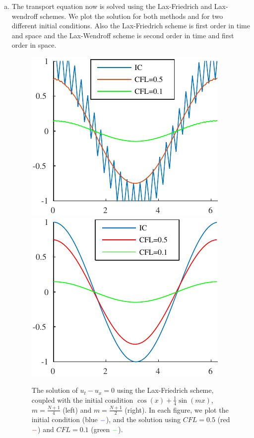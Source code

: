 \documentclass[10pt,a4paper,twoside, french]{article}
\numberwithin{equation}{section}
\numberwithin{figure}{section}
\numberwithin{table}{section}
\begin{document}
\begin{enumerate}
\begin{enumerate}[a.]
\item The transport equation now is solved using the Lax-Friedrich and Lax-wendroff schemes. We plot the solution for both methods and for two different initial conditions. Also the Lax-Friedrich scheme is first order in time and space and  the Lax-Wendroff scheme is second order in time and first order in space.

\begin{figure}
\centering
\includegraphics[scale=1]{fig/LAXF_IC1}
\includegraphics[scale=1]{fig/LAXF_IC2}
\caption{The solution of $u_t-u_x=0$ using the Lax-Friedrich scheme, coupled with the initial condition $\cos(x)+\frac{1}{4}\sin(mx)$, $m=\frac{N+1}{4}$ (left) and $m=\frac{N+1}{2}$ (right). In each figure, we plot the initial condition (blue $\color{blue} -$), and the solution using $CFL=0.5$ (red $\color{red} -$) and $CFL=0.1$ (green $\color{green} -$).}
\end{figure}


\end{enumerate}
\end{enumerate}
\end{document}
